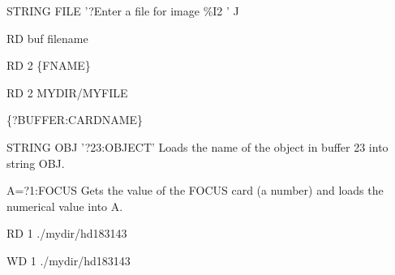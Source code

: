 {\newpage\clearpage
{}%
\begin{hanging}
  \item{STRING FILE '?Enter a file for image \%I2 ' J}
\end{hanging}%
\lthtmlfigureZ
\lthtmlcheckvsize\clearpage}

{\newpage\clearpage
{}%
\begin{hanging}
  \item{RD buf filename}
\end{hanging}%
\lthtmlfigureZ
\lthtmlcheckvsize\clearpage}

{\newpage\clearpage
{}%
\begin{hanging}
  \item{RD 2 \{FNAME\}}
\end{hanging}%
\lthtmlfigureZ
\lthtmlcheckvsize\clearpage}

{\newpage\clearpage
{}%
\begin{hanging}
  \item{RD 2 MYDIR/MYFILE}
\end{hanging}%
\lthtmlfigureZ
\lthtmlcheckvsize\clearpage}

{\newpage\clearpage
{}%
\begin{hanging}
  \item{\{?BUFFER:CARDNAME\}}
\end{hanging}%
\lthtmlfigureZ
\lthtmlcheckvsize\clearpage}

{\newpage\clearpage
{}%
\begin{example}
  \item[STRING OBJ '{?23:OBJECT}'\hfill]{Loads the name of the object
       in buffer 23 into string {OBJ}.}
  \item[A={?1:FOCUS}\hfill]{Gets the value of the FOCUS
       card (a number) and loads the numerical value into A.}
\end{example}%
\lthtmlfigureZ
\lthtmlcheckvsize\clearpage}

{\newpage\clearpage
{}%
\begin{hanging}
    \item {RD 1 ./mydir/hd183143}
  \end{hanging}%
\lthtmlfigureZ
\lthtmlcheckvsize\clearpage}

{\newpage\clearpage
{}%
\begin{hanging}
    \item {WD 1 ./mydir/hd183143}
  \end{hanging}%
\lthtmlfigureZ
\lthtmlcheckvsize\clearpage}

